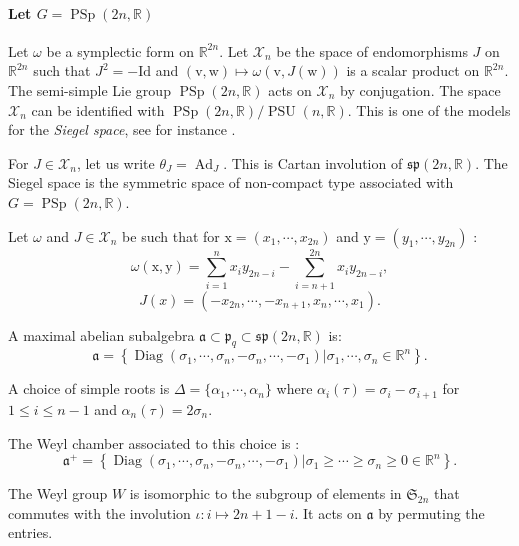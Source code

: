\documentclass[reqno,10pt]{amsart}
\theoremstyle{plain}
\theoremstyle{definition}
\theoremstyle{remark}
\newcommand{\type}{\tau}
\newcommand{\R}{\mathbb{R}}
\newcommand{\Id}{\text{Id}}
\DeclareMathOperator{\PSU}{PSU}
\DeclareMathOperator{\PSp}{PSp}
\DeclareMathOperator{\Diag}{Diag}
\DeclareMathOperator{\Ad}{Ad}
\begin{document}
\bigskip

\paragraph*{Let $G=\PSp(2n,\R)$} Let $\omega$ be a symplectic form on $\R^{2n}$. Let $\mathcal{X}_n$ be the space of endomorphisms $J$ on $\R^{2n}$ such that $J^2=-\Id$ and $(\mathrm{v},\mathrm{w})\mapsto \omega(\mathrm{v} ,J (\mathrm{w}))$ is a scalar product on $\R^{2n}$. The semi-simple Lie group $\PSp(2n,\R)$ acts on $\mathcal{X}_n$ by conjugation. The space $\mathcal{X}_n$ can be identified with $\PSp(2n,\R)/\PSU(n,\R)$. This is one of the models for the \emph{Siegel space}, see for instance \cite{BPSiegel}. 

\smallskip

For $J\in \mathcal{X}_n$, let us write  $\theta_J=\Ad_J$. This is Cartan involution of $\mathfrak{sp}(2n,\R)$. The Siegel space is the symmetric space of non-compact type associated with $G=\PSp(2n,\R)$.

\smallskip

 Let $\omega$ and $J\in \mathcal{X}_n$ be such that for $\mathrm{x}=(x_1,\cdots,x_{2n})$ and $\mathrm{y}=(y_1,\cdots,y_{2n})$ :
\[\omega(\mathrm{x},\mathrm{y})=\sum^{n}_{i=1} x_iy_{2n-i}-\sum^{2n}_{i=n+1} x_iy_{2n-i},\]
\[ J(x)=(-x_{2n},\cdots,-x_{n+1}, x_n, \cdots ,x_1).\]

A maximal abelian subalgebra $\mathfrak{a}\subset \mathfrak{p}_q\subset \mathfrak{sp}(2n,\R)$ is:
$$\mathfrak{a}=\left\lbrace\Diag(\sigma_1,\cdots,\sigma_n, -\sigma_n, \cdots, -\sigma_1)|\sigma_1,\cdots,\sigma_n\in \R^n\right\rbrace.$$

A choice of simple roots is $\Delta=\lbrace\alpha_1,\cdots,\alpha_{n}\rbrace$ where $\alpha_i(\type)=\sigma_i-\sigma_{i+1}$ for $1\leq i\leq n-1$ and $\alpha_n(\type)=2\sigma_n$.

The Weyl chamber associated to this choice is :
$$\mathfrak{a}^+=\left\lbrace\Diag(\sigma_1,\cdots,\sigma_n, -\sigma_n, \cdots, -\sigma_1)|\sigma_1\geq \cdots\geq \sigma_n\geq 0\in \R^n\right\rbrace.$$

The Weyl group $W$ is isomorphic to the subgroup of elements in $\mathfrak{S}_{2n}$ that commutes with the involution $\iota:i\mapsto 2n+1-i$. It acts on $\mathfrak{a}$ by permuting the entries.
\end{document}
